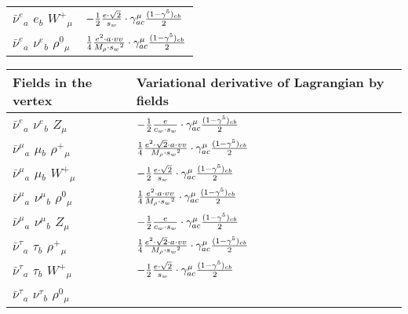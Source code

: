 \begin{center}
\begin{tabular}{|l|l|}
$\bar{\nu}^e{}_{a }$ \phantom{-} $e{}_{b }$ \phantom{-} $W^+{}_{\mu }$ \phantom{-}  &
	$-\frac{1}{2}\frac{ e \cdot\sqrt{2}}{ s_w}\cdot \gamma_{a c}^\mu {(1-\gamma^5)_{c b}\over 2} $\\[2mm]
$\bar{\nu}^e{}_{a }$ \phantom{-} $\nu^e{}_{b }$ \phantom{-} $\rho^0{}_{\mu }$ \phantom{-}  &
	$\frac{1}{4}\frac{ e{}^2  \cdot a \cdot vv}{ M_{\rho} \cdot s_w{}^2 }\cdot \gamma_{a c}^\mu {(1-\gamma^5)_{c b}\over 2} $\\ \hline
\end{tabular}

\begin{tabular}{|l|l|} \hline
Fields in the vertex & Variational derivative of Lagrangian by fields \\ \hline
$\bar{\nu}^e{}_{a }$ \phantom{-} $\nu^e{}_{b }$ \phantom{-} ${Z}_{\mu }$ \phantom{-}  &
	$-\frac{1}{2}\frac{ e}{ c_w \cdot s_w}\cdot \gamma_{a c}^\mu {(1-\gamma^5)_{c b}\over 2} $\\[2mm]
$\bar{\nu}^\mu{}_{a }$ \phantom{-} $\mu{}_{b }$ \phantom{-} $\rho^+{}_{\mu }$ \phantom{-}  &
	$\frac{1}{4}\frac{ e{}^2  \cdot\sqrt{2} \cdot a \cdot vv}{ M_{\rho} \cdot s_w{}^2 }\cdot \gamma_{a c}^\mu {(1-\gamma^5)_{c b}\over 2} $\\[2mm]
$\bar{\nu}^\mu{}_{a }$ \phantom{-} $\mu{}_{b }$ \phantom{-} $W^+{}_{\mu }$ \phantom{-}  &
	$-\frac{1}{2}\frac{ e \cdot\sqrt{2}}{ s_w}\cdot \gamma_{a c}^\mu {(1-\gamma^5)_{c b}\over 2} $\\[2mm]
$\bar{\nu}^\mu{}_{a }$ \phantom{-} $\nu^\mu{}_{b }$ \phantom{-} $\rho^0{}_{\mu }$ \phantom{-}  &
	$\frac{1}{4}\frac{ e{}^2  \cdot a \cdot vv}{ M_{\rho} \cdot s_w{}^2 }\cdot \gamma_{a c}^\mu {(1-\gamma^5)_{c b}\over 2} $\\[2mm]
$\bar{\nu}^\mu{}_{a }$ \phantom{-} $\nu^\mu{}_{b }$ \phantom{-} ${Z}_{\mu }$ \phantom{-}  &
	$-\frac{1}{2}\frac{ e}{ c_w \cdot s_w}\cdot \gamma_{a c}^\mu {(1-\gamma^5)_{c b}\over 2} $\\[2mm]
$\bar{\nu}^\tau{}_{a }$ \phantom{-} $\tau{}_{b }$ \phantom{-} $\rho^+{}_{\mu }$ \phantom{-}  &
	$\frac{1}{4}\frac{ e{}^2  \cdot\sqrt{2} \cdot a \cdot vv}{ M_{\rho} \cdot s_w{}^2 }\cdot \gamma_{a c}^\mu {(1-\gamma^5)_{c b}\over 2} $\\[2mm]
$\bar{\nu}^\tau{}_{a }$ \phantom{-} $\tau{}_{b }$ \phantom{-} $W^+{}_{\mu }$ \phantom{-}  &
	$-\frac{1}{2}\frac{ e \cdot\sqrt{2}}{ s_w}\cdot \gamma_{a c}^\mu {(1-\gamma^5)_{c b}\over 2} $\\[2mm]
$\bar{\nu}^\tau{}_{a }$ \phantom{-} $\nu^\tau{}_{b }$ \phantom{-} $\rho^0{}_{\mu }$ \phantom{-}  &

\end{tabular}
\end{center}
